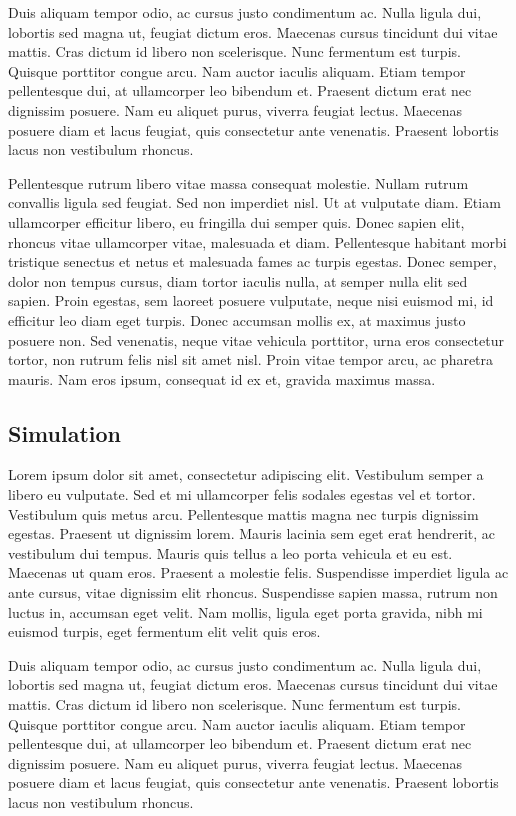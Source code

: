 \documentclass{acm_proc_article-sp}
\begin{document}
Duis aliquam tempor odio, ac cursus justo condimentum ac. Nulla ligula dui, lobortis sed magna ut, feugiat dictum eros. Maecenas cursus tincidunt dui vitae mattis. Cras dictum id libero non scelerisque. Nunc fermentum est turpis. Quisque porttitor congue arcu. Nam auctor iaculis aliquam. Etiam tempor pellentesque dui, at ullamcorper leo bibendum et. Praesent dictum erat nec dignissim posuere. Nam eu aliquet purus, viverra feugiat lectus. Maecenas posuere diam et lacus feugiat, quis consectetur ante venenatis. Praesent lobortis lacus non vestibulum rhoncus.

Pellentesque rutrum libero vitae massa consequat molestie. Nullam rutrum convallis ligula sed feugiat. Sed non imperdiet nisl. Ut at vulputate diam. Etiam ullamcorper efficitur libero, eu fringilla dui semper quis. Donec sapien elit, rhoncus vitae ullamcorper vitae, malesuada et diam. Pellentesque habitant morbi tristique senectus et netus et malesuada fames ac turpis egestas. Donec semper, dolor non tempus cursus, diam tortor iaculis nulla, at semper nulla elit sed sapien. Proin egestas, sem laoreet posuere vulputate, neque nisi euismod mi, id efficitur leo diam eget turpis. Donec accumsan mollis ex, at maximus justo posuere non. Sed venenatis, neque vitae vehicula porttitor, urna eros consectetur tortor, non rutrum felis nisl sit amet nisl. Proin vitae tempor arcu, ac pharetra mauris. Nam eros ipsum, consequat id ex et, gravida maximus massa.

\subsection{Simulation}

Lorem ipsum dolor sit amet, consectetur adipiscing elit. Vestibulum semper a libero eu vulputate. Sed et mi ullamcorper felis sodales egestas vel et tortor. Vestibulum quis metus arcu. Pellentesque mattis magna nec turpis dignissim egestas. Praesent ut dignissim lorem. Mauris lacinia sem eget erat hendrerit, ac vestibulum dui tempus. Mauris quis tellus a leo porta vehicula et eu est. Maecenas ut quam eros. Praesent a molestie felis. Suspendisse imperdiet ligula ac ante cursus, vitae dignissim elit rhoncus. Suspendisse sapien massa, rutrum non luctus in, accumsan eget velit. Nam mollis, ligula eget porta gravida, nibh mi euismod turpis, eget fermentum elit velit quis eros.

Duis aliquam tempor odio, ac cursus justo condimentum ac. Nulla ligula dui, lobortis sed magna ut, feugiat dictum eros. Maecenas cursus tincidunt dui vitae mattis. Cras dictum id libero non scelerisque. Nunc fermentum est turpis. Quisque porttitor congue arcu. Nam auctor iaculis aliquam. Etiam tempor pellentesque dui, at ullamcorper leo bibendum et. Praesent dictum erat nec dignissim posuere. Nam eu aliquet purus, viverra feugiat lectus. Maecenas posuere diam et lacus feugiat, quis consectetur ante venenatis. Praesent lobortis lacus non vestibulum rhoncus.
\end{document}
